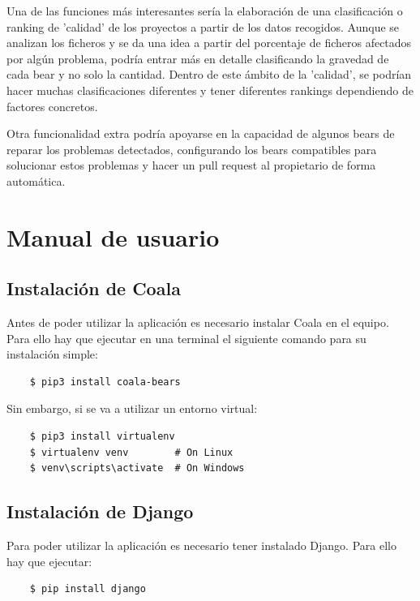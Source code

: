 \documentclass[a4paper, 12pt]{book}
\begin{document}
Una de las funciones más interesantes sería la elaboración de una clasificación o ranking de 'calidad' de los proyectos a partir de los datos recogidos. Aunque se analizan los ficheros y se da una idea a partir del porcentaje de ficheros afectados por algún problema, podría entrar más en detalle clasificando la gravedad de cada bear y no solo la cantidad. Dentro de este ámbito de la 'calidad', se podrían hacer muchas clasificaciones diferentes y tener diferentes rankings dependiendo de factores concretos.

Otra funcionalidad extra podría apoyarse en la capacidad de algunos bears de reparar los problemas detectados, configurando los bears compatibles para solucionar estos problemas y hacer un pull request al propietario de forma automática.


\cleardoublepage
\appendix
\chapter{Manual de usuario}
\label{app:manual}

\section{Instalación de Coala}
\label{app:inst_coala}
Antes de poder utilizar la aplicación es necesario instalar Coala en el equipo. Para ello hay que ejecutar en una terminal el siguiente comando para su instalación simple:
{\footnotesize
\begin{verbatim}
    $ pip3 install coala-bears
\end{verbatim}
}

Sin embargo, si se va a utilizar un entorno virtual:
{\footnotesize
\begin{verbatim}
    $ pip3 install virtualenv
    $ virtualenv venv        # On Linux
    $ venv\scripts\activate  # On Windows
\end{verbatim}
}

\section{Instalación de Django}
\label{app:inst_Django}
Para poder utilizar la aplicación es necesario tener instalado Django. Para ello hay que ejecutar:
{\footnotesize
\begin{verbatim}
    $ pip install django
\end{verbatim}
}
\end{document}
